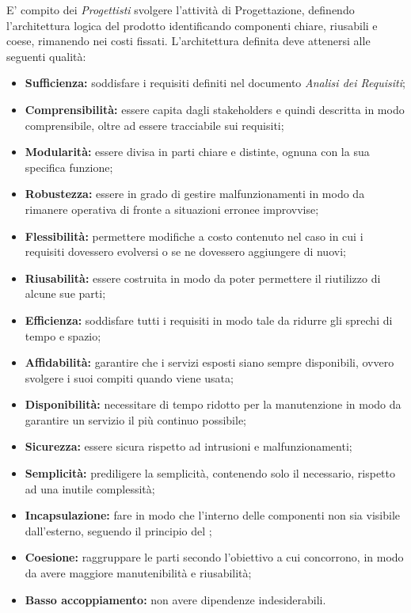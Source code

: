 \documentclass[../NomeDocumento.tex]{subfiles}
\begin{document}
	E' compito dei \textit{Progettisti} svolgere l'attività di Progettazione, definendo l'architettura logica del prodotto identificando componenti chiare, riusabili e coese, rimanendo nei costi fissati. L'architettura definita deve attenersi alle seguenti qualità:
	\begin{itemize}
		\item \textbf{Sufficienza:} soddisfare i requisiti definiti nel documento \textit{Analisi dei Requisiti};
		\item \textbf{Comprensibilità:} essere capita dagli stakeholders e quindi descritta in modo comprensibile, oltre ad essere tracciabile sui requisiti;
		\item \textbf{Modularità:} essere divisa in parti chiare e distinte, ognuna con la sua specifica funzione;
		\item \textbf{Robustezza:} essere in grado di gestire malfunzionamenti in modo da rimanere operativa di fronte a situazioni erronee improvvise;
		\item \textbf{Flessibilità:} permettere modifiche a costo contenuto nel caso in cui i requisiti dovessero evolversi o se ne dovessero aggiungere di nuovi;
		\item \textbf{Riusabilità:} essere costruita in modo da poter permettere il riutilizzo di alcune sue parti;
		\item \textbf{Efficienza:} soddisfare tutti i requisiti in modo tale da ridurre gli sprechi di tempo e spazio;
		\item \textbf{Affidabilità:} garantire che i servizi esposti siano sempre disponibili, ovvero svolgere i suoi compiti quando viene usata;
		\item \textbf{Disponibilità:} necessitare di tempo ridotto per la manutenzione in modo da garantire un servizio il più continuo possibile;
		\item \textbf{Sicurezza:} essere sicura rispetto ad intrusioni e malfunzionamenti;
		\item \textbf{Semplicità:} prediligere la semplicità, contenendo solo il necessario, rispetto ad una inutile complessità;
		\item \textbf{Incapsulazione:} fare in modo che l'interno delle componenti non sia visibile dall'esterno, seguendo il principio del ;
		\item \textbf{Coesione:} raggruppare le parti secondo l'obiettivo a cui concorrono, in modo da avere maggiore manutenibilità e riusabilità;
		\item \textbf{Basso accoppiamento:} non avere dipendenze indesiderabili.
	\end{itemize}
\end{document}
